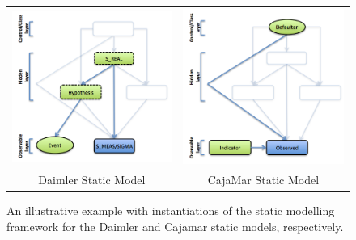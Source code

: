 \begin{figure}[ht!]
\begin{center}
\begin{tabular}{cc}
\includegraphics[scale=0.4]{./figures/DaimlerStaticModelling}
&
\includegraphics[scale=0.4]{./figures/CajaMarStaticModelling}
\\Daimler Static Model & CajaMar Static Model \\
\end{tabular}
\caption{\label{Figure:StaticModellingInstantiations} An illustrative example with instantiations of the static modelling framework for the Daimler and Cajamar static models, respectively.}
\end{center}
\end{figure}
